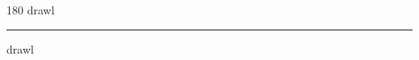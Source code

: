 
\begin{frame}
\begin{center}
\begin{turn}{180}
{\fontsize{2.5cm}{1em}\selectfont drawl}
\end{turn}
\vspace{1em}\par  
\hrule
\vspace{1em}\par  
{\fontsize{2.5cm}{1em}\selectfont drawl}
\end{center}
\end{frame}
